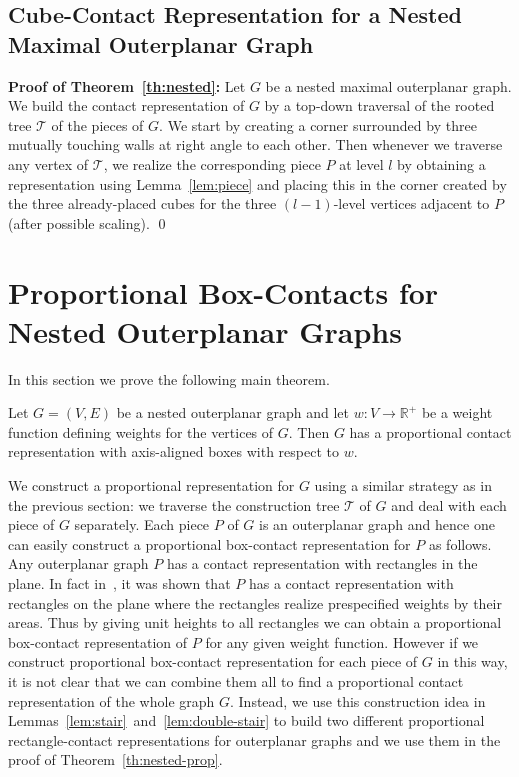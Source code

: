 \documentclass{llncs}
\begin{document}
\subsection{Cube-Contact Representation for a Nested Maximal Outerplanar Graph}


\noindent
\textbf{Proof of Theorem~\ref{th:nested}:} Let $G$ be a nested maximal outerplanar graph.
 We build the contact representation of $G$ by a top-down traversal of the rooted tree
 $\mathcal{T}$ of the pieces of $G$.
 We start by creating a corner surrounded by three mutually touching walls at right angle
 to each other. Then whenever we traverse any vertex of $\mathcal{T}$, we realize the
 corresponding piece $P$ at level $l$ by obtaining a representation using
 Lemma~\ref{lem:piece} and placing  this in the corner created by the three already-placed
 cubes for the three $(l-1)$-level vertices adjacent to $P$ (after possible scaling). \qed










\section{Proportional Box-Contacts for Nested Outerplanar Graphs}


In this section we prove the following main theorem.



\begin{theorem}
\label{th:nested-prop}
	Let $G=(V,E)$ be a nested outerplanar graph and let $w:V\rightarrow\mathbb{R}^+$
	 be a weight function defining weights for the vertices of $G$. Then $G$ has a
	 proportional contact representation with axis-aligned boxes with respect to $w$.
\end{theorem}

We construct a proportional representation for $G$ using a similar strategy as in the previous
 section: we traverse the construction tree $\mathcal{T}$ of $G$ and deal with each piece
 of $G$ separately. Each piece $P$ of $G$ is an outerplanar graph and hence one can easily
 construct a proportional box-contact representation for $P$ as follows. Any outerplanar
 graph $P$ has a contact representation with rectangles in the plane. In fact in~\cite{ourAlg13},
 it was shown that $P$ has a contact representation with rectangles
 on the plane where the rectangles realize prespecified weights by
 their areas. Thus by giving unit heights to all rectangles we can
 obtain a proportional box-contact representation of $P$ for any given
 weight function. 
However if we construct proportional box-contact representation for each piece of $G$ in this way,
it is not clear that we can combine them all to find a proportional contact representation of the
 whole graph $G$. 
Instead, we use this construction idea in Lemmas~\ref{lem:stair}~and~\ref{lem:double-stair} to
build two different proportional rectangle-contact representations for
outerplanar graphs
and we use them in the proof of Theorem~\ref{th:nested-prop}. 
\end{document}
